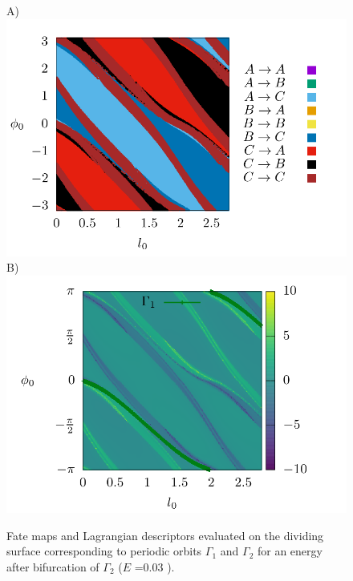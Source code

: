 \documentclass[10pt,aps,onecolumn,superscriptaddress]{revtex4-2}
\begin{document}
\begin{figure}[htbp]
	A)\includegraphics[scale=0.35]{fate_map_ds_gamma1E_003.png}
	B)\includegraphics[scale=0.35]{ld_action_ds_gamma1_E_003.png}
	\caption{ Fate maps and Lagrangian descriptors evaluated on the dividing surface corresponding to periodic orbits $\Gamma_1$ and $\Gamma_2$ for an energy after bifurcation of $\Gamma_2$  ($E$ =0.03 ). }
	\label{fig:ld_fm_ds_E_003}
\end{figure}
\end{document}
